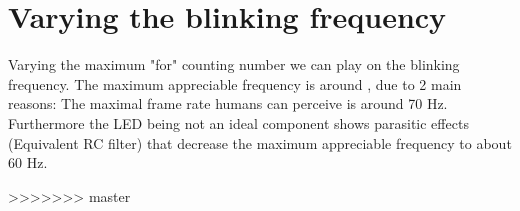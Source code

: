 \documentclass[12pt]{article}
\begin{document}
\section{Varying the blinking frequency}

Varying the maximum "for" counting number we can play on the blinking frequency.
The maximum appreciable frequency is around , due to 2 main reasons:
The maximal frame rate humans can perceive is around 70 Hz. Furthermore the LED being not an ideal component shows parasitic effects (Equivalent RC filter) that decrease the maximum appreciable frequency to about 60 Hz. 




>>>>>>> master
\end{document}
